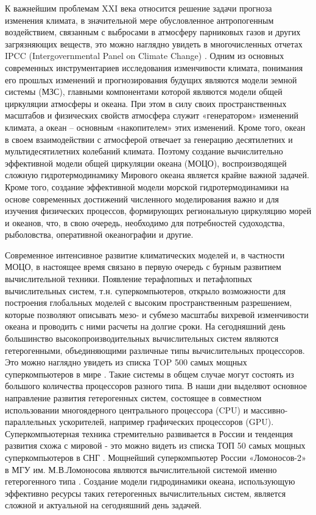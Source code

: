 
{\actuality}

К важнейшим проблемам XXI века относится решение задачи прогноза изменения климата, в значительной мере обусловленное антропогенным воздействием,
связанным с выбросами в атмосферу парниковых газов и других загрязняющих веществ, это можно наглядно увидеть в многочисленных отчетах
IPCC (Intergovernmental Panel on Climate Change) \cite{IPCC21}.
Одним из основных современных инструментариев исследования изменчивости климата, понимания его прошлых изменений и прогнозирования будущих являются модели земной системы (МЗС),
главными компонентами которой являются модели общей циркуляции атмосферы и океана.
При этом в силу своих пространственных масштабов и физических свойств атмосфера служит «генератором» изменений климата,
а океан – основным «накопителем» этих изменений. Кроме того, океан в своем взаимодействии с атмосферой отвечает за генерацию десятилетних
и мультидесятилетних колебаний климата.
Поэтому создание вычислительно эффективной модели общей циркуляции океана (МОЦО), воспроизводящей сложную гидротермодинамику
Мирового океана является крайне важной задачей. Кроме того, создание эффективной модели морской гидротермодинамики на основе современных достижений
численного моделирования важно и для изучения физических процессов, формирующих региональную циркуляцию морей и океанов, что,
в свою очередь, необходимо для потребностей судоходства, рыболовства, оперативной океанографии и другие.

Современное интенсивное развитие климатических моделей и, в частности МОЦО, в настоящее время связано в первую очередь с бурным развитием вычислительной техники.
Появление терафлопных и петафлопных вычислительных систем, т.н. суперкомпьютеров, открыло возможности для построения глобальных моделей с
высоким пространственным разрешением, которые позволяют описывать мезо- и субмезо масштабы вихревой изменчивости океана и проводить с ними расчеты на долгие сроки.
На сегодняшний день большинство высокопроизводительных вычислительных систем являются гетерогенными, объединяющими различные типы вычислительных процессоров.
Это можно наглядно увидеть из списка TOP 500 самых мощных суперкомпьютеров в мире \cite{TOP500}.
Такие системы в общем случае могут состоять из большого количества процессоров разного типа.
В наши дни выделяют основное направление развития гетерогенных систем, состоящее в совместном использовании многоядерного центрального процессора (CPU)
и массивно-параллельных ускорителей, например графических процессоров (GPU).
Суперкомпьютерная техника стремительно развивается в России и тенденция развития схожа с мировой - это можно видеть из списка ТОП 50
самых мощных суперкомпьютеров в СНГ \cite{TOP50}.
Мощнейший суперкомпьютер России «Ломоносов-2» в МГУ им. М.В.Ломоносова являются вычислительной системой именно гетерогенного типа \cite{L2}.
Создание модели гидродинамики океана, использующую эффективно ресурсы таких гетерогенных вычислительных систем,
является сложной и актуальной на сегодняшний день задачей.

